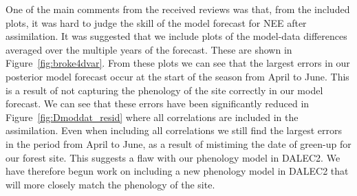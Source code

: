 \documentclass[11pt]{article}
\begin{document}
One of the main comments from the received reviews was that, from the included plots, it was hard to judge the skill of the model forecast for NEE after assimilation. It was suggested that we include plots of the model-data differences averaged over the multiple years of the forecast. These are shown in Figure~\ref{fig:broke4dvar}. From these plots we can see that the largest errors in our posterior model forecast occur at the start of the season from April to June. This is a result of not capturing the phenology of the site correctly in our model forecast. We can see that these errors have been significantly reduced in Figure~\ref{fig:Dmoddat_resid} where all correlations are included in the assimilation. Even when including all correlations we still find the largest errors in the period from April to June, as a result of mistiming the date of green-up for our forest site. This suggests a flaw with our phenology model in DALEC2. We have therefore begun work on including a new phenology model in DALEC2 that will more closely match the phenology of the site. 
\end{document}

